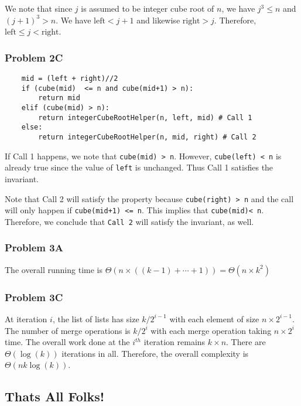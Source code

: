 \documentclass[
]{article}
\begin{document}
We note that since \(j\) is assumed to be integer cube root of \(n\), we
have \(j^3 \leq n\) and \((j+1)^3 > n\). We have \(\text{left} < j+1\)
and likewise \(\text{right} > j\). Therefore,
\(\text{left} \leq j < \text{right}\).

\hypertarget{problem-2c}{%
\subsubsection{Problem 2C}\label{problem-2c}}

\begin{verbatim}
    mid = (left + right)//2
    if (cube(mid)  <= n and cube(mid+1) > n):
        return mid
    elif (cube(mid) > n):
        return integerCubeRootHelper(n, left, mid) # Call 1
    else:
        return integerCubeRootHelper(n, mid, right) # Call 2
\end{verbatim}

If Call 1 happens, we note that \texttt{cube(mid)\ \textgreater{}\ n}.
However, \texttt{cube(left)\ \textless{}\ n} is already true since the
value of \texttt{left} is unchanged. Thus Call 1 satisfies the
invariant.

Note that Call 2 will satisfy the property because
\texttt{cube(right)\ \textgreater{}\ n} and the call will only happen if
\texttt{cube(mid+1)\ \textless{}=\ n}. This implies that
\texttt{cube(mid)\textless{}\ n}. Therefore, we conclude that
\texttt{Call\ 2} will satisfy the invariant, as well.

\hypertarget{problem-3a}{%
\subsubsection{Problem 3A}\label{problem-3a}}

The overall running time is
\(\Theta( n \times ( (k-1) + \cdots + 1))= \Theta(n \times k^2)\)

\hypertarget{problem-3c}{%
\subsubsection{Problem 3C}\label{problem-3c}}

At iteration \(i\), the list of lists has size \(k/2^{i-1}\) with each
element of size \(n \times 2^{i-1}\). The number of merge operations is
\(k/2^i\) with each merge operation taking \(n \times 2^{i}\) time. The
overall work done at the \(i^{th}\) iteration remains \(k \times n\).
There are \(\Theta(\log(k))\) iterations in all. Therefore, the overall
complexity is \(\Theta(n k \log(k))\).

\hypertarget{thats-all-folks}{%
\subsection{That\textquotesingle s All Folks!}\label{thats-all-folks}}
\end{document}
